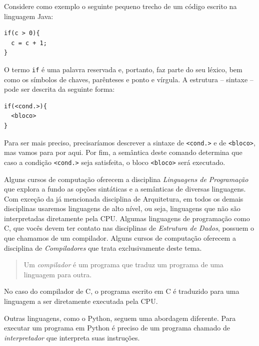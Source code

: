 Considere como exemplo o seguinte pequeno trecho de um código escrito na linguagem Java:

\begin{lstlisting}
if(c > 0){
  c = c + 1;
}
\end{lstlisting}

O termo {\tt if} é uma palavra reservada e, portanto, faz parte do seu léxico, bem como os símbolos de chaves, parênteses e ponto e vírgula.
A estrutura -- sintaxe -- pode ser descrita da seguinte forma:

\begin{lstlisting}
if(<cond.>){
  <bloco>
}
\end{lstlisting}

Para ser mais preciso, precisaríamos descrever a sintaxe de {\tt <cond.>} e de {\tt <bloco>}, mas vamos para por aqui.
Por fim, a semântica deste comando determina que caso a condição {\tt <cond.>} seja satisfeita, o bloco {\tt <bloco>} será executado.

Alguns cursos de computação oferecem a disciplina {\em Linguagens de Programação} que explora a fundo as opções sintáticas e a semânticas de diversas linguagens.
Com exceção da já mencionada disciplina de Arquitetura, em todos os demais disciplinas usaremos linguagens de alto nível, ou seja, linguagens que não são interpretadas diretamente pela CPU.
Algumas linguagens de programação como C, que vocês devem ter contato nas disciplinas de {\em Estrutura de Dados}, possuem o que chamamos de um compilador.
Alguns cursos de computação oferecem a disciplina de {\em Compiladores} que trata exclusivamente deste tema.

\begin{quote}
  Um {\em compilador} é um programa que traduz um programa de uma linguagem para outra.
\end{quote}

No caso do compilador de C, o programa escrito em C é traduzido para uma linguagem a ser diretamente executada pela CPU.

\begin{center}
\end{center}

Outras linguagens, como o Python, seguem uma abordagem diferente.
Para executar um programa em Python é preciso de um programa chamado de {\em interpretador} que interpreta suas instruções.

